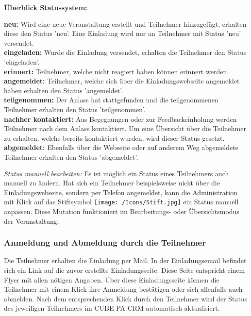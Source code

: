 \textbf{Überblick Statussystem:}

\textbf{neu:} Wird eine neue Veranstaltung erstellt und Teilnehmer hinzugefügt, erhalten diese den Status 'neu'. Eine Einladung wird nur an Teilnehmer mit Status 'neu' versendet.\\
\textbf{eingeladen:} Wurde die Einladung versendet, erhalten die Teilnehmer den Status 'eingeladen'.\\
\textbf{erinnert:} Teilnehmer, welche nicht reagiert haben können erinnert werden.\\
\textbf{angemeldet:} Teilnehmer, welche sich über die Einladungswebseite angemeldet haben erhalten den Status 'angemeldet'.\\
\textbf{teilgenommen:} Der Anlass hat stattgefunden und die teilgenommenen Teilnehmer erhalten den Status 'teilgenommen'.\\
\textbf{nachher kontaktiert:} Aus Begegnungen oder zur Feedbackeinholung werden Teilnehmer nach dem Anlass kontaktiert. Um eine Übersicht über die Teilnehmer zu erhalten, welche bereits kontaktiert wurden, wird dieser Status gesetzt.\\
\textbf{abgemeldet:} Ebenfalls über die Webseite oder auf anderem Weg abgemeldete Teilnehmer erhalten den Status 'abgemeldet'.\\

\vspace{\baselineskip}

\textit{Status manuell bearbeiten:} Es ist möglich ein Status eines Teilnehmers auch manuell zu ändern. Hat sich ein Teilnehmer beispielsweise nicht über die Einladungswebseite, sondern per Telefon angemeldet, kann die Administration mit Klick auf das Stiftsymbol \texttt{[image: /Icons/Stift.jpg]} ein Status manuell anpassen. Diese Mutation funktioniert im Bearbeitungs- oder Übersichtsmodus der Veranstaltung.

\subsubsection{Anmeldung und Abmeldung durch die Teilnehmer}

Die Teilnehmer erhalten die Einladung per Mail. In der Einladungsemail befindet sich ein Link auf die zuvor erstellte Einladungsseite. Diese Seite entspricht einem Flyer mit allen nötigen Angaben. Über diese Einladungsseite können die Teilnehmer mit einem Klick ihre Anmeldung bestätigen oder sich allenfalls auch abmelden. Nach dem entsprechenden Klick durch den Teilnehmer wird der Status des jeweiligen Teilnehmers im CUBE PA CRM automatisch aktualisiert. 

